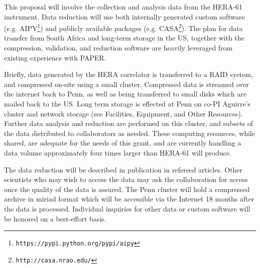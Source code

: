 \documentclass[preprint]{aastex}
\begin{document}
\parskip 0.25in


This proposal will involve the collection and analysis data from the HERA-61 instrument.
Data reduction will use both internally generated custom software (e.g. AIPY\footnote{\tt https://pypi.python.org/pypi/aipy}) and publicly available packages (e.g. CASA\footnote{ \tt http://casa.nrao.edu/}).  The plan for data transfer from South Africa and long-term storage in the US, together with the compression, validation, and reduction software are heavily leveraged from existing experience with PAPER. \parskip 0pt

Briefly, data generated by the HERA correlator is transferred to a RAID system, and compressed on-site using a small cluster.  Compressed data is streamed over the internet back to Penn, as well as being transferred to small disks which are mailed back to the US.  Long term storage is effected at Penn on co-PI Aguirre's cluster and network storage (see Facilities, Equipment, and Other Resources).  Further data analysis and reduction are performed on this cluster, and subsets of the data distributed to collaborators as needed.  These computing resources, while shared, are adequate for the needs of this grant, and are currently handling a data volume approximately four times larger than HERA-61 will produce.  

The data reduction will be described in publication in refereed articles.  Other
scientists who may wish to access the data may ask the collaboration for access once the quality of the data is assured.  The Penn cluster will hold a compressed archive in {\sc miriad} format which will be accessible via the Internet 18 months after the data is processed. Individual inquiries for other data or custom software will be honored on a best-effort basis. 
\end{document}
